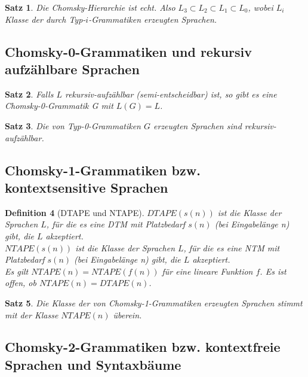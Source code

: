 \documentclass[11pt]{article}
\theoremstyle{break}
\newtheorem{satz}{Satz}[section]
\newtheorem{defi}[satz]{Definition}
\begin{document}
\begin{satz}
Die Chomsky-Hierarchie ist echt. Also $L_3\subset L_2\subset L_1\subset L_0$, wobei $L_i$ Klasse der durch Typ-$i$-Grammatiken erzeugten Sprachen.
\end{satz}


\subsection{Chomsky-0-Grammatiken und rekursiv aufzählbare Sprachen}

\begin{satz}
Falls $L$ rekursiv-aufzählbar (semi-entscheidbar) ist, so gibt es eine Chomsky-0-Grammatik G mit $L(G)=L$.
\end{satz}

\begin{satz}
Die von Typ-0-Grammatiken $G$ erzeugten Sprachen sind rekursiv-aufzählbar.
\end{satz}


\subsection{Chomsky-1-Grammatiken bzw. kontextsensitive Sprachen}

\begin{defi}[DTAPE und NTAPE]
$DTAPE(s(n))$ ist die Klasse der Sprachen $L$, für die es eine DTM mit Platzbedarf $s(n)$ (bei Eingabelänge n) gibt, die $L$ akzeptiert.\\
$NTAPE(s(n))$ ist die Klasse der Sprachen $L$, für die es eine NTM mit Platzbedarf $s(n)$ (bei Eingabelänge n) gibt, die $L$ akzeptiert.\\
Es gilt $NTAPE(n)=NTAPE(f(n))$ für eine lineare Funktion $f$. Es ist offen, ob $NTAPE(n)=DTAPE(n)$.
\end{defi}

\begin{satz}
Die Klasse der von Chomsky-1-Grammatiken erzeugten Sprachen stimmt mit der Klasse $NTAPE(n)$ überein.
\end{satz}


\subsection{Chomsky-2-Grammatiken bzw. kontextfreie Sprachen und Syntaxbäume}
\end{document}
